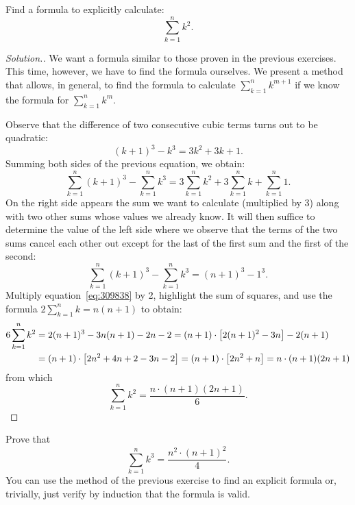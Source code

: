 \begin{exercise}
\label{ex:somma_quadrati}
  Find a formula to explicitly calculate:
  \[
    \sum_{k=1}^n k^2.
  \]
\end{exercise}
\begin{proof}[Solution.]
We want a formula similar to those proven in the previous exercises. 
This time, however, we have to find the formula ourselves.
We present a method that allows, in general, 
to find the formula to calculate $\sum_{k=1}^n k^{m+1}$
if we know the formula for $\sum_{k=1}^n k^m$.

Observe that the difference 
of two consecutive cubic terms turns out to be quadratic:
\[
(k+1)^3 - k^3 = 3 k^2 + 3k + 1.  
\]
Summing both sides of the previous equation, we obtain:
\begin{equation}\label{eq:309838}
\sum_{k=1}^n (k+1)^3 - \sum_{k=1}^n k^3 
= 3\sum_{k=1}^n k^2+3\sum_{k=1}^n k+\sum_{k=1}^n 1.
\end{equation}
On the right side appears the sum we want to calculate 
(multiplied by 3)
along with two other sums whose values we already know. 
It will then suffice to determine the value of the left side where 
we observe that the terms of the two sums cancel each other out 
except for the last of the first sum 
and the first of the second: 
\[
  \sum_{k=1}^n(k+1)^3 - \sum_{k=1}^n k^3 = (n+1)^3 - 1^3.
\]
Multiply equation~\eqref{eq:309838} by 2,
highlight the sum of squares, and 
use the formula $2\sum_{k=1}^n k = n(n+1)$
to obtain:
\begin{align*}
  6 \sum_{k=1}^n k^2 
  &=  2(n+1)^3 - 3 n(n+1) - 2n - 2
  = (n+1) \cdot {\left[ 2(n+1)^2 - 3n \right]} - 2(n+1)\\
  &= (n+1)\cdot {\left[ 2n^2+4n+2 -3n - 2 \right]}
   = (n+1)\cdot {\left[ 2n^2+n \right]} 
   = n \cdot (n+1)(2n+1)
\end{align*}
from which 
\begin{equation}\label{eq:somma_quadrati}
  \sum_{k=1}^n k^2 = \frac{n\cdot (n+1)(2n+1)}{6}.
\end{equation}
\end{proof}

\begin{exercise}
Prove that 
\[
  \sum_{k=1}^n k^3 = \frac{n^2\cdot (n+1)^2}{4}.
\]
You can use the method of the previous exercise to find an explicit formula 
or, trivially, just verify by induction that the formula is valid.
\end{exercise}

